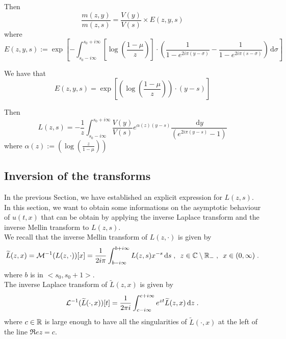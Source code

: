 \documentclass[11pt]{amsart}
\renewcommand{\Re}{\mathfrak{R}e}
\newcommand{\diff}{\,\mathrm{d}}
\begin{document}
Then 
\begin{equation*}
    \frac{m(z,y)}{m(z,s)} 
    = 
    \frac{V(y)}{V(s)} \times E(z,y,s)
\end{equation*}
where $$E(z,y,s) := \exp \left[
    - \int_{s_0-i\infty}^{s_0+i\infty} \left[\log \left( \frac{1-\mu}{z}\right) \right]
    \cdot \left(
        \frac{1}{1-e^{2i\pi(y-\sigma)}} - \frac{1}{1-e^{2i\pi(s-\sigma)}}
     \right) \diff \sigma \right]
     $$

We have that
\begin{equation*}
    E(z,y,s) 
    = 
    \exp
        \left[
     \left(\log \left( \frac{1-\mu}{z}\right) \right)
    \cdot (y-s)\right]
\end{equation*}

Then 
\begin{equation}\label{eq:exprL}
    L(z,s) 
    = 
   - \frac{1}{z}\int_{s_0-i\infty}^{s_0+i\infty} \frac{V(y)}{V(s)} e^{ \alpha(z)(y-s)}
   \frac{\diff y}{(e^{2i\pi(y-s)}-1)}
\end{equation}
where $\alpha(z) :=  
    \left(\log \left( \frac{z}{1-\mu}\right)\right)$
\subsection{Inversion of the transforms} In the previous Section, we have established an explicit expression for $L(z,s)$. In this section, we want to obtain some informations on the asymptotic behaviour of $u(t,x)$ that can be obtain by applying the inverse Laplace transform and the inverse Mellin transform to $L(z,s)$. \\

We recall that the inverse Mellin transform of $L(z,\cdot)$ is given by 
\begin{equation*}
    \tilde{L}(z,x) = \Mcal^{-1}(L(z, \cdot))[x] = \frac{1}{2i\pi} \int_{b-i\infty}^{b+i\infty} L(z,s)x^{-s}\diff s
    \eqsepv
    z \in \CC \setminus \RR_-
    \eqsepv x \in (0, \infty)
    \eqfinp
\end{equation*}
where $b$ is in $<s_0, s_0+1>$.\\
The inverse Laplace transform of $\tilde{L}(z,x)$ is given by 
\begin{equation*}
     \Lcal^{-1}(\tilde L(\cdot, x))[t] 
     = \frac{1}{2\pi i} \int_{c-i\infty}^{c+i\infty} e^{zt}\tilde L(z,x) \diff z
     \eqfinp
\end{equation*}
where $c \in \mathbb{R}$ is large enough to have all the singularities of $\tilde L(\cdot,x)$ at the left of the line $\Re z = c$. 
\medskip
\end{document}

